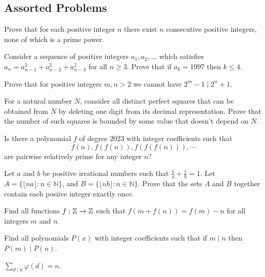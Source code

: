 \subsection{Assorted Problems}
\begin{problem}{\label{p:i:n:pr:1}}
  Prove that for each positive integer $n$ there exist $n$ consecutive
    positive integers, none of which is a prime power.
\end{problem}
\begin{problem}{\label{p:i:n:pr:2}}
  Consider a sequence of positive integers $a_1,a_2,\ldots$ which satisfies
    $a_n=a_{n-1}^2+a_{n-2}^2+a_{n-3}^2$ for all $n\ge 3$. Prove that if
    $a_k=1997$ then $k\le 4$.
\end{problem}
\begin{problem}{\label{p:i:n:pr:2b}}
      Prove that for positive integers $m,n>2$ we cannot have $2^m-1\mid
        2^n+1$.
\end{problem}
\begin{problem}{\label{p:i:n:pr:3}}
   For a natural number $N$, consider all distinct perfect squares that
    can be obtained from $N$ by deleting one digit from its decimal
    representation. Prove that the number of such squares is bounded by some
    value that doesn't depend on $N$.
\end{problem}
\begin{problem}{\label{p:i:n:pr:4}}
  Is there a polynomial $f$ of degree $2023$ with integer
    coefficients such that \[f(n), f(f(n)), f(f(f(n))), \cdots\] are pairwise
    relatively prime for any integer $n$?
\end{problem}
\begin{problem}{\label{p:i:n:pr:5}}
  Let $a$ and $b$ be positive irrational numbers such that $\frac 1a+\frac 1b=1$.
    Let $A=\{\lfloor na\rfloor: n\in\mathbb N\}$, and $B=\{\lfloor nb\rfloor:
    n\in\mathbb N\}$. Prove that the sets $A$ and $B$ together contain each
    posiive integer exactly once.
\end{problem}
\begin{problem}{\label{p:i:n:pr:6}}
  Find all functions $f:\mathbb{Z}\to\mathbb{Z}$ such that $f(m+f(n))=f(m)-n$ for all
    integers $m$ and $n$.
\end{problem}
\begin{problem}{\label{p:i:n:pr:7}}
  Find all polynomials $P(x)$ with integer coefficients such that if
    $m\mid n$ then $P(m)\mid P(n)$.
\end{problem}
\begin{result}{\label{r:i:n:pr:1}}
    $\displaystyle\sum_{d\mid n}\varphi(d)=n$.
\end{result}

